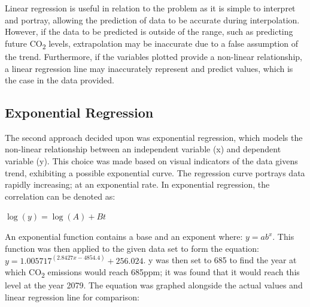 \documentclass{mcmthesis}
\begin{document}
    \begin{center}
    \end{center}

    Linear regression is useful in relation to the problem as it is simple to interpret and portray, allowing the prediction of data to be accurate during interpolation. However, if the data to be predicted is outside of the range, such as predicting future CO\textsubscript{2} levels, extrapolation may be inaccurate due to a false assumption of the trend. Furthermore, if the variables plotted provide a non-linear relationship, a linear regression line may inaccurately represent and predict values, which is the case in the data provided.


    \subsection{Exponential Regression}
    The second approach decided upon was exponential regression, which models the non-linear relationship between an independent variable (x) and dependent variable (y). This choice was made based on visual indicators of the data given\textquotesingle s trend, exhibiting a possible exponential curve. The regression curve portrays data rapidly increasing; at an exponential rate. In exponential regression, the correlation can be denoted as:

    ${\log(y) = \log (A) + B t}$

    An exponential function contains a base and an exponent where: ${y = a b ^x}$. This function was then applied to the given data set to form the equation: ${y = 1.005717^(2.8427x - 4854.4) + 256.024}$. {y} was then set to 685 to find the year at which CO\textsubscript{2} emissions would reach 685ppm; it was found that it would reach this level at the year 2079. The equation was graphed alongside the actual values and linear regression line for comparison:
\end{document}
